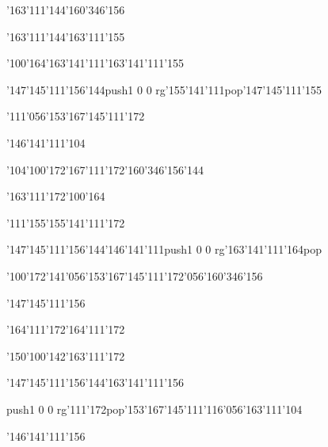 \null\vfill\ipa\centerline{\enskip\char'163\char'111\char'144\enskip\enskip\enskip\enskip\enskip\char'160\char'346\char'156\enskip\enskip\enskip\enskip\enskip}\medskip\centerline{\enskip\enskip\enskip\enskip\enskip\enskip\enskip\enskip\char'163\char'111\char'144\enskip\char'163\char'111\char'155}\medskip\centerline{\enskip\char'100\char'164\enskip\enskip\enskip\enskip\enskip\enskip\enskip\enskip\char'163\char'141\char'111\enskip\char'163\char'141\char'111\char'155}\medskip\centerline{\enskip\enskip\enskip\enskip\char'147\char'145\char'111\char'156\char'144\enskip\pdfcolorstack\match push{1 0 0 rg}\char'155\char'141\char'111\pdfcolorstack\match pop{}\enskip\char'147\char'145\char'111\char'155}\medskip\centerline{\enskip\enskip\enskip\enskip\enskip\enskip\char'111\char'056\char'153\char'167\char'145\char'111\char'172\enskip\enskip\enskip\enskip}\medskip\centerline{\enskip\enskip\enskip\enskip\enskip\enskip\enskip\enskip\char'146\char'141\char'111\char'104}\medskip\vfill\footline{\hfil\tt\folio\hfil}\eject
\null\vfill\ipa\centerline{\enskip\char'104\char'100\char'172\enskip\enskip\enskip\enskip\enskip\char'167\char'111\char'172\enskip\char'160\char'346\char'156\char'144}\medskip\centerline{\enskip\char'163\char'111\char'172\enskip\char'100\char'164\enskip\enskip\enskip\enskip\enskip\enskip\enskip\enskip}\medskip\centerline{\enskip\char'111\char'155\enskip\enskip\enskip\enskip\enskip\enskip\enskip\enskip\enskip\enskip\enskip\enskip\char'155\char'141\char'111\char'172}\medskip\centerline{\enskip\enskip\enskip\enskip\char'147\char'145\char'111\char'156\char'144\enskip\char'146\char'141\char'111\enskip\pdfcolorstack\match push{1 0 0 rg}\char'163\char'141\char'111\char'164\pdfcolorstack\match pop{}}\medskip\centerline{\enskip\char'100\char'172\enskip\enskip\enskip\char'141\char'056\char'153\char'167\char'145\char'111\char'172\char'056\char'160\char'346\char'156}\medskip\centerline{\enskip\enskip\enskip\enskip\enskip\enskip\enskip\enskip\char'147\char'145\char'111\char'156}\medskip\vfill\footline{\hfil\tt\folio\hfil}\eject
\null\vfill\ipa\centerline{\enskip\char'164\char'111\char'172\enskip\enskip\enskip\enskip\enskip\char'164\char'111\char'172\enskip\enskip\enskip\enskip\enskip}\medskip\centerline{\enskip\char'150\char'100\char'142\enskip\enskip\enskip\enskip\char'163\char'111\char'172\enskip\enskip\enskip\enskip}\medskip\centerline{\enskip\enskip\enskip\enskip\enskip\enskip\enskip\enskip\enskip\enskip\enskip\enskip\enskip\enskip\enskip\enskip\enskip\enskip}\medskip\centerline{\enskip\enskip\enskip\enskip\char'147\char'145\char'111\char'156\char'144\enskip\enskip\enskip\enskip\enskip\char'163\char'141\char'111\char'156}\medskip\centerline{\enskip\pdfcolorstack\match push{1 0 0 rg}\char'111\char'172\pdfcolorstack\match pop{}\enskip\enskip\enskip\enskip\char'153\char'167\char'145\char'111\char'116\char'056\char'163\char'111\char'104}\medskip\centerline{\enskip\enskip\enskip\enskip\enskip\enskip\enskip\enskip\char'146\char'141\char'111\char'156}\medskip\vfill\footline{\hfil\tt\folio\hfil}\eject
